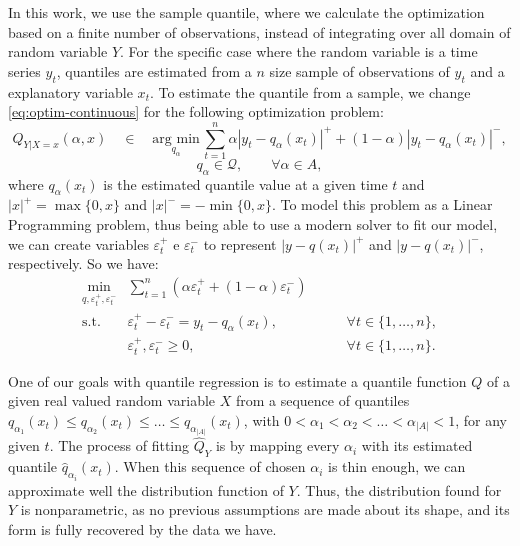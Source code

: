 In this work, we use the sample quantile,  where we calculate the optimization based on a finite number of observations, instead of integrating over all domain of random variable $Y$. For the specific case where the random variable is a time series $y_t$, quantiles are estimated from a $n$ size sample of observations of $y_t$ and a explanatory variable $x_t$.  To estimate the quantile from a sample, we change \ref{eq:optim-continuous} for the following optimization problem:
\begin{equation}
Q_{Y|X=x}(\alpha,x)\quad \in\quad\underset{q_\alpha}{\text{arg min}}\,\sum_{t=1}^{n}\alpha|y_{t}-q_\alpha(x_t)|^{+}+(1-\alpha)|y_{t}-q_\alpha(x_t)|^{-},
\label{eq:linear-model}
\end{equation}
\begin{equation}
  q_\alpha  \in \mathcal{Q}, \qquad \forall {\alpha \in A}, 
\end{equation}
where $q_\alpha(x_t)$ is the estimated quantile value at a given time $t$ and $|x|^+=\max\{0,x\}$ and $|x|^-=-\min\{0,x\}$. To model this problem as a Linear Programming problem, thus being able to use a modern solver to fit our model,  we can create variables $\varepsilon^+_t$ e $\varepsilon^-_t$ to represent $|y-q(x_t)|^+$ and $|y-q(x_t)|^-$, respectively. So we have:
\begin{equation}
\begin{aligned}\min_{q,\varepsilon_{t}^{+}, \varepsilon_{t}^{-}} & \sum_{t=1}^{n}\left(\alpha \varepsilon_{t}^{+}+(1-\alpha)\varepsilon_{t}^{-}\right) & \\
\mbox{s.t. } & \varepsilon_{t}^{+}-\varepsilon_{t}^{-}=y_{t}-q_\alpha(x_{t}), & \qquad\forall t \in \{1,\dots,n\},\\
& \varepsilon_t^+,\varepsilon_t^- \geq 0, & \qquad \forall t \in \{1,\dots,n\}.
\end{aligned}
\label{eq:qar-general}
\end{equation}


One of our goals with quantile regression is to estimate a quantile function $Q$ of a given real valued random variable $X$ from a sequence of quantiles $q_{\alpha_1}(x_t) \leq q_{\alpha_2}(x_t) \leq \dots \leq q_{\alpha_{|A|}}(x_t)$, with $0 < \alpha_1 < \alpha_2 < \dots < \alpha_{|A|} < 1$, for any given $t$. 
The process of fitting $\hat{Q}_Y$ is by mapping every $\alpha_i$ with its estimated quantile $\hat{q}_{\alpha_i}(x_t)$. 
When this sequence of chosen $\alpha_i$ is thin enough, we can approximate well the distribution function of $Y$.
Thus, the distribution found for $Y$ is nonparametric, as no previous assumptions are made about its shape, and its form is fully recovered by the data we have.
 
